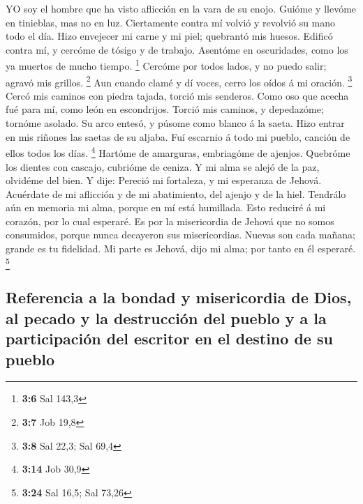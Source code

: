  YO soy el hombre que ha visto aflicción en la vara de su
enojo.  Guióme y llevóme en tinieblas, mas no en luz.
 Ciertamente contra mí volvió y revolvió su mano todo el
día.  Hizo envejecer mi carne y mi piel; quebrantó mis
huesos.  Edificó contra mí, y cercóme de tósigo y de
trabajo.  Asentóme en oscuridades, como los ya muertos de
mucho tiempo. \footnote{\textbf{3:6} Sal 143,3}  Cercóme por
todos lados, y no puedo salir; agravó mis grillos. \footnote{\textbf{3:7}
  Job 19,8}  Aun cuando clamé y dí voces, cerro los oídos á
mi oración. \footnote{\textbf{3:8} Sal 22,3; Sal 69,4} 
Cercó mis caminos con piedra tajada, torció mis senderos. 
Como oso que acecha fué para mí, como león en escondrijos. 
Torció mis caminos, y depedazóme; tornóme asolado.  Su arco
entesó, y púsome como blanco á la saeta.  Hizo entrar en
mis riñones las saetas de su aljaba.  Fuí escarnio á todo
mi pueblo, canción de ellos todos los días. \footnote{\textbf{3:14} Job
  30,9}  Hartóme de amarguras, embriagóme de ajenjos.
 Quebróme los dientes con cascajo, cubrióme de ceniza.
 Y mi alma se alejó de la paz, olvidéme del bien.
 Y dije: Pereció mi fortaleza, y mi esperanza de Jehová.
 Acuérdate de mi aflicción y de mi abatimiento, del ajenjo
y de la hiel.  Tendrálo aún en memoria mi alma, porque en
mí está humillada.  Esto reduciré á mi corazón, por lo cual
esperaré.  Es por la misericordia de Jehová que no somos
consumidos, porque nunca decayeron sus misericordias. 
Nuevas son cada mañana; grande es tu fidelidad.  Mi parte
es Jehová, dijo mi alma; por tanto en él esperaré. \footnote{\textbf{3:24}
  Sal 16,5; Sal 73,26}

\hypertarget{referencia-a-la-bondad-y-misericordia-de-dios-al-pecado-y-la-destrucciuxf3n-del-pueblo-y-a-la-participaciuxf3n-del-escritor-en-el-destino-de-su-pueblo}{%
\subsection{Referencia a la bondad y misericordia de Dios, al pecado y
la destrucción del pueblo y a la participación del escritor en el
destino de su
pueblo}\label{referencia-a-la-bondad-y-misericordia-de-dios-al-pecado-y-la-destrucciuxf3n-del-pueblo-y-a-la-participaciuxf3n-del-escritor-en-el-destino-de-su-pueblo}}

